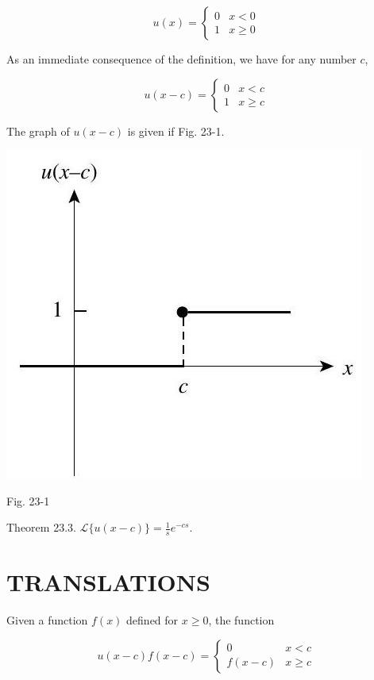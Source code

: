 \documentclass[10pt]{article}
\begin{document}
$$
u(x)= \begin{cases}0 & x<0 \\ 1 & x \geq 0\end{cases}
$$

As an immediate consequence of the definition, we have for any number $c$,

$$
u(x-c)= \begin{cases}0 & x<c \\ 1 & x \geq c\end{cases}
$$

The graph of $u(x-c)$ is given if Fig. 23-1.

\begin{center}
\includegraphics[max width=\textwidth]{2024_04_03_5bb5b4275a64cb9887d1g-252(2)}
\end{center}

Fig. 23-1

Theorem 23.3. $\mathscr{L}\{u(x-c)\}=\frac{1}{s} e^{-c s}$.

\section*{TRANSLATIONS}
Given a function $f(x)$ defined for $x \geq 0$, the function

$$
u(x-c) f(x-c)=\left\{\begin{array}{cc}
0 & x<c \\
f(x-c) & x \geq c
\end{array}\right.
$$
\end{document}

